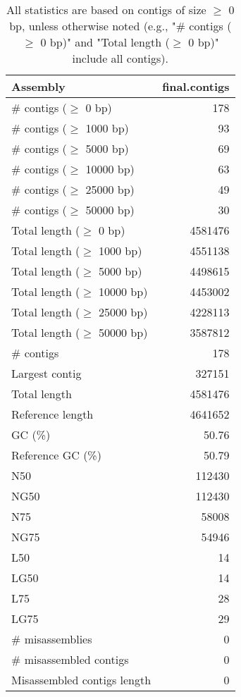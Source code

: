 \documentclass[12pt,a4paper]{article}
\begin{document}
\begin{table}[ht]
\begin{center}
\caption{All statistics are based on contigs of size $\geq$ 0 bp, unless otherwise noted (e.g., "\# contigs ($\geq$ 0 bp)" and "Total length ($\geq$ 0 bp)" include all contigs).}
\begin{tabular}{|l*{1}{|r}|}
\hline
Assembly & final.contigs \\ \hline
\# contigs ($\geq$ 0 bp) & 178 \\ \hline
\# contigs ($\geq$ 1000 bp) & 93 \\ \hline
\# contigs ($\geq$ 5000 bp) & 69 \\ \hline
\# contigs ($\geq$ 10000 bp) & 63 \\ \hline
\# contigs ($\geq$ 25000 bp) & 49 \\ \hline
\# contigs ($\geq$ 50000 bp) & 30 \\ \hline
Total length ($\geq$ 0 bp) & 4581476 \\ \hline
Total length ($\geq$ 1000 bp) & 4551138 \\ \hline
Total length ($\geq$ 5000 bp) & 4498615 \\ \hline
Total length ($\geq$ 10000 bp) & 4453002 \\ \hline
Total length ($\geq$ 25000 bp) & 4228113 \\ \hline
Total length ($\geq$ 50000 bp) & 3587812 \\ \hline
\# contigs & 178 \\ \hline
Largest contig & 327151 \\ \hline
Total length & 4581476 \\ \hline
Reference length & 4641652 \\ \hline
GC (\%) & 50.76 \\ \hline
Reference GC (\%) & 50.79 \\ \hline
N50 & 112430 \\ \hline
NG50 & 112430 \\ \hline
N75 & 58008 \\ \hline
NG75 & 54946 \\ \hline
L50 & 14 \\ \hline
LG50 & 14 \\ \hline
L75 & 28 \\ \hline
LG75 & 29 \\ \hline
\# misassemblies & 0 \\ \hline
\# misassembled contigs & 0 \\ \hline
Misassembled contigs length & 0 \\ \hline

\end{tabular}
\end{center}
\end{table}
\end{document}
